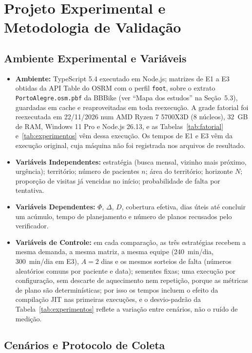\documentclass[11pt,a4paper]{article}
\begin{document}
\section{Projeto Experimental e Metodologia de Validação}

\subsection{Ambiente Experimental e Variáveis}
\begin{itemize}
    \item \textbf{Ambiente:} TypeScript 5.4 executado em Node.js; matrizes de E1 a E3 obtidas da API Table do OSRM com o perfil \texttt{foot}, sobre o extrato \texttt{PortoAlegre.osm.pbf} da BBBike (ver ``Mapa dos estudos'' na Seção~5.3), guardadas em cache e reaproveitadas em toda reexecução. A grade fatorial foi reexecutada em 22/11/2026 num AMD Ryzen 7 5700X3D (8 núcleos), 32~GB de RAM, Windows 11 Pro e Node.js 26.13, e as Tabelas~\ref{tab:fatorial} e~\ref{tab:experimentos} vêm dessa execução. Os tempos de E1 e E3 vêm da execução original, cuja máquina não foi registrada nos arquivos de resultado.
    \item \textbf{Variáveis Independentes:} estratégia (busca mensal, vizinho mais próximo, urgência); território; número de pacientes $n$; área do território; horizonte $N$; proporção de visitas já vencidas no início; probabilidade de falta por tentativa.
    \item \textbf{Variáveis Dependentes:} $\Phi$, $\Delta$, $D$, cobertura efetiva, dias úteis até concluir um acúmulo, tempo de planejamento e número de planos recusados pelo verificador.
    \item \textbf{Variáveis de Controle:} em cada comparação, as três estratégias recebem a mesma demanda, a mesma matriz, a mesma equipe (240~min/dia, 300~min/dia em E3), $A = 2$ dias e os mesmos sorteios de falta (números aleatórios comuns por paciente e data); sementes fixas; uma execução por configuração, sem descarte de aquecimento nem repetição, porque as métricas de plano são determinísticas; por isso os tempos incluem o efeito da compilação JIT nas primeiras execuções, e o desvio-padrão da Tabela~\ref{tab:experimentos} reflete a variação entre cenários, não o ruído de medição.
\end{itemize}

\subsection{Cenários e Protocolo de Coleta}
\end{document}
